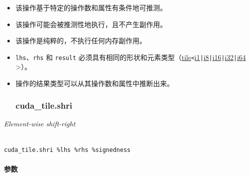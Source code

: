 \documentclass{article}
\begin{document}
\begin{itemize}
\item 该操作基于特定的操作数和属性有条件地可推测。
\item 该操作可能会被推测性地执行，且不产生副作用。
\item 该操作是纯粹的，不执行任何内存副作用。
\item \texttt{lhs}、\texttt{rhs} 和 \texttt{result} 必须具有相同的形状和元素类型（\href{https://docs.nvidia.com/cuda/tile-ir/latest/sections/types.html#type-tile}{tile}\texttt{<}\href{https://docs.nvidia.com/cuda/tile-ir/latest/sections/types.html#subsection-element-types}{i1}\texttt{|}\href{https://docs.nvidia.com/cuda/tile-ir/latest/sections/types.html#subsection-element-types}{i8}\texttt{|}\href{https://docs.nvidia.com/cuda/tile-ir/latest/sections/types.html#subsection-element-types}{i16}\texttt{|}\href{https://docs.nvidia.com/cuda/tile-ir/latest/sections/types.html#subsection-element-types}{i32}\texttt{|}\href{https://docs.nvidia.com/cuda/tile-ir/latest/sections/types.html#subsection-element-types}{i64} >）。
\item 操作的结果类型可以从其操作数和属性中推断出来。




\subsubsection{cuda\_tile.shri}


\end{itemize}
\textit{Element-wise shift-right}




\begin{lstlisting}

cuda_tile.shri %lhs %rhs %signedness

\end{lstlisting}



\paragraph{参数}
\end{document}
